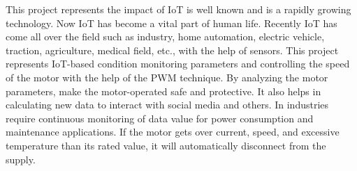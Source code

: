 This project represents the impact of IoT is well known and is a rapidly growing technology. Now IoT has become a vital part of human life. Recently IoT has come all over the field such as industry, home automation, electric vehicle, traction, agriculture, medical field, etc., with the help of sensors. This project represents IoT-based condition monitoring parameters and controlling the speed of the motor with the help of the PWM technique. By analyzing the motor parameters, make the motor-operated safe and protective. It also helps in calculating new data to interact with social media and others. In industries require continuous monitoring of data value for power consumption and maintenance applications. If the motor gets over current, speed, and excessive temperature than its rated value, it will automatically disconnect from the supply.\\